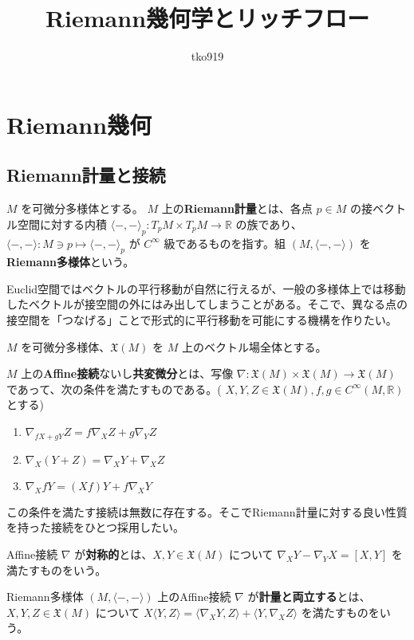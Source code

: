\documentclass[dvipdfmx,a4paper]{jsreport}
\title{Riemann幾何学とリッチフロー}
\author{tko919}
\date{}
\theoremstyle{definition}
\newcommand{\R}{\mathbb{R}}
\begin{document}
\maketitle
\tableofcontents

\chapter{Riemann幾何}

\section{Riemann計量と接続}
 $M$ を可微分多様体とする。 $M$ 上の\textbf{Riemann計量}とは、各点 $p \in M$ の接ベクトル空間に対する内積 $\langle -,- \rangle_p \colon T_pM \times T_pM \to \R$ の族であり、$\langle -,- \rangle \colon M \ni p \mapsto \langle -,- \rangle_p$ が $C^\infty$ 級であるものを指す。組 $(M,\langle -,- \rangle)$ を\textbf{Riemann多様体}という。


Euclid空間ではベクトルの平行移動が自然に行えるが、一般の多様体上では移動したベクトルが接空間の外にはみ出してしまうことがある。そこで、異なる点の接空間を「つなげる」ことで形式的に平行移動を可能にする機構を作りたい。

 $M$ を可微分多様体、$\mathfrak{X}(M)$ を $M$ 上のベクトル場全体とする。

$M$ 上の\textbf{Affine接続}ないし\textbf{共変微分}とは、写像 $\nabla:\mathfrak{X}(M) \times \mathfrak{X}(M) \to \mathfrak{X}(M)$ であって、次の条件を満たすものである。( $X,Y,Z \in \mathfrak{X}(M), f,g \in C^\infty(M,\R)$ とする)

\begin{enumerate}
    \item $\nabla_{fX+gY}Z=f\nabla_XZ+g\nabla_Y Z$
    \item $\nabla_{X}(Y+Z)=\nabla_XY+\nabla_X Z$ 
    \item $\nabla_{X}fY=(Xf)Y+f\nabla_X Y$
\end{enumerate}

この条件を満たす接続は無数に存在する。そこでRiemann計量に対する良い性質を持った接続をひとつ採用したい。

 Affine接続 $\nabla$ が\textbf{対称的}とは、$X,Y \in \mathfrak{X}(M)$ について $\nabla_XY-\nabla_YX=[X,Y]$ を満たすものをいう。

 Riemann多様体 $(M,\langle -,- \rangle)$ 上のAffine接続 $\nabla$ が\textbf{計量と両立する}とは、$X,Y,Z \in \mathfrak{X}(M)$ について $X \langle Y,Z \rangle=\langle \nabla_X Y,Z \rangle+\langle Y,\nabla_X Z \rangle$ を満たすものをいう。
\end{document}
